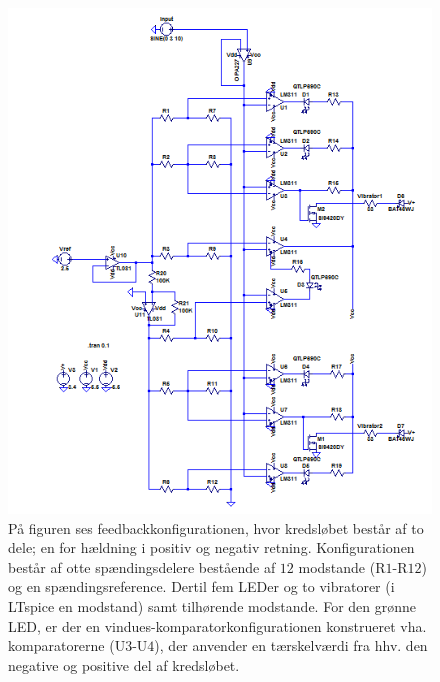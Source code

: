\begin{figure}[H] 
	\centering
	\includegraphics[scale=0.9]{figures/cProblemloesning/komparator_uden_vaerdi.PNG}
	\caption{På figuren ses feedbackkonfigurationen, hvor kredsløbet består af to dele; en for hældning i positiv og negativ retning. Konfigurationen består af otte spændingsdelere bestående af $12$ modstande (R$1$-R$12$) og en spændingsreference. Dertil fem LEDer og to vibratorer (i LTspice en modstand) samt tilhørende modstande. For den grønne LED, er der en vindues-komparatorkonfigurationen  konstrueret vha. komparatorerne (U$3$-U$4$), der anvender en tærskelværdi fra hhv. den negative og positive del af kredsløbet.}
	\label{fig:komparator_uden_vaerdi}
\end{figure}


